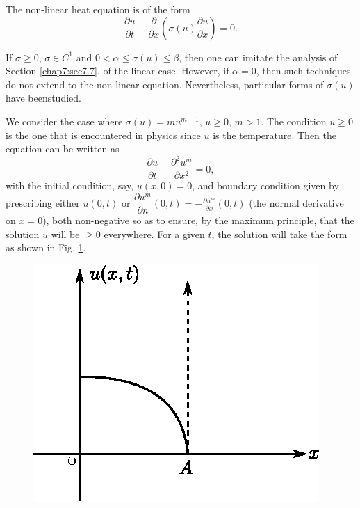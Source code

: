 The non-linear heat equation is of the form
\begin{equation*}
\frac{\partial u}{\partial t} - \frac{\partial}{\partial x} \left(\sigma
(u) \frac{\partial u}{\partial x}\right) = 0 .\tag{7.32}\label{eq7.32} 
\end{equation*}

If $\sigma \geq 0$, $\sigma \in C^1$ and $0 < \alpha \leq \sigma (u)
\leq \beta$, then one can imitate the analysis of Section
\ref{chap7:sec7.7}. of the linear case. However, if $\alpha =0$, then
such techniques do not extend to the non-linear
equation. Nevertheless, particular forms of $\sigma (u)$ have
been\pageoriginale studied. 

We consider the case where $\sigma (u) = mu^{m-1} $, $u \geq 0$,
$m>1$. The condition $u\geq 0$ is the one that is encountered in
physics since $u$ is the temperature. Then the equation can be written
as  
\begin{equation*}
\frac{\partial u}{\partial t} - \frac{\partial^2 u^m}{\partial x^2} = 0,
\tag{7.33}\label{eq7.33}
\end{equation*}
with the initial condition, say, $u(x,0) =0$, and boundary condition
given by prescribing either $u(0,t)$ or $\dfrac{\partial u^m}{\partial
  n} (0,t) = - \frac{\partial u^m}{\partial x} (0,t)$ (the normal
derivative on $x=0$), both non-negative so as to ensure, by the
maximum principle, that the solution $u$ will be $\geq 0$
everywhere. For a given $t$, the solution will take the form as shown
in Fig. \ref{c7:fig7.2}.  
\begin{figure}[H]
\centering
\includegraphics{figures/fig52-7.2.eps}
\caption{}\label{c7:fig7.2}
\end{figure}


